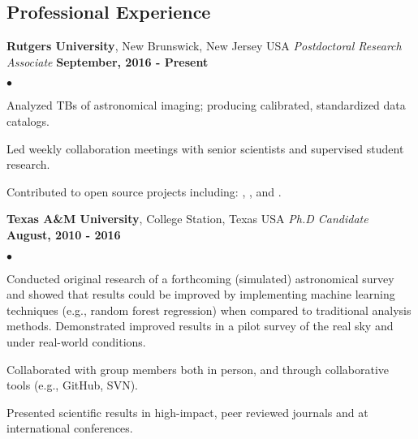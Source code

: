\documentclass[margin,line, 11pt]{res}
\newenvironment{list2}{
  \begin{list}{$\bullet$}{%
      \setlength{\itemsep}{0in}
      \setlength{\parsep}{0in} \setlength{\parskip}{0in}
      \setlength{\topsep}{0in} \setlength{\partopsep}{0in}
      \setlength{\leftmargin}{0.2in}}}{\end{list}}
\begin{document}
\begin{resume}
\section{Professional \newline Experience}
\textbf{Rutgers University}, New Brunswick, New Jersey USA \newline
\textit{Postdoctoral Research Associate} \hfill \textbf{September, 2016 - Present}\newline
    \begin{list2}
    	\vspace*{-5mm}
    	\item Analyzed TBs of astronomical imaging; producing calibrated, standardized data catalogs.
    	\item Led weekly collaboration meetings with senior scientists and supervised student research.
    	\item Contributed to open source projects including: \href{https://github.com/boada/photometrypipeline}{}, \href{http://astlib.sourceforge.net/}{}, and \href{https://github.com/boada/easyGalaxy}{}.
    \end{list2}
\vspace*{-4mm}

\textbf{Texas A\&M University}, College Station, Texas USA\newline
\textit{Ph.D Candidate} \hfill \textbf{August, 2010 - 2016}\newline
    \begin{list2}
    	\vspace*{-5mm}
    	\item Conducted original research of a forthcoming (simulated) astronomical survey and showed that results could be improved by implementing machine learning techniques (e.g., random forest regression) when compared to traditional analysis methods. Demonstrated improved results in a pilot survey of the real sky and under real-world conditions.
    	\item Collaborated with group members both in person, and through collaborative tools (e.g., GitHub, SVN).
    	\item Presented scientific results in high-impact, peer reviewed journals and at international conferences.
    \end{list2}
\vspace*{-4mm}


\end{resume}
\end{document}
